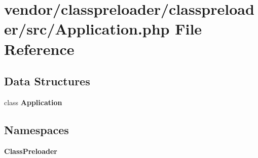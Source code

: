\section{vendor/classpreloader/classpreloader/src/\+Application.php File Reference}
\label{classpreloader_2classpreloader_2src_2_application_8php}
\subsection*{Data Structures}
\begin{DoxyCompactItemize}
\item 
class {\bf Application}
\end{DoxyCompactItemize}
\subsection*{Namespaces}
\begin{DoxyCompactItemize}
\item 
 {\bf Class\+Preloader}
\end{DoxyCompactItemize}
